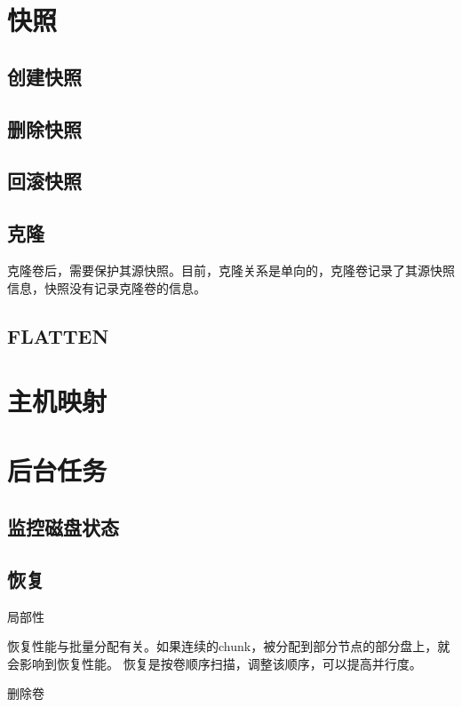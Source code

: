\section{快照}

\subsection{创建快照}

\subsection{删除快照}

\subsection{回滚快照}

\subsection{克隆}

克隆卷后，需要保护其源快照。目前，克隆关系是单向的，克隆卷记录了其源快照信息，快照没有记录克隆卷的信息。

\subsection{FLATTEN}

\section{主机映射}

\section{后台任务}

\subsection{监控磁盘状态}

\subsection{恢复}

局部性

恢复性能与批量分配有关。如果连续的chunk，被分配到部分节点的部分盘上，就会影响到恢复性能。
恢复是按卷顺序扫描，调整该顺序，可以提高并行度。

删除卷

